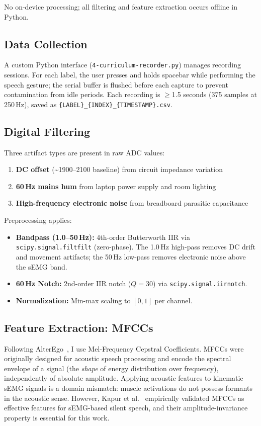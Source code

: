 \documentclass{article}
\begin{document}
No on-device processing; all filtering and feature extraction occurs offline in Python.

\subsection{Data Collection}

A custom Python interface (\texttt{4-curriculum-recorder.py}) manages recording sessions. For each label, the user presses and holds spacebar while performing the speech gesture; the serial buffer is flushed before each capture to prevent contamination from idle periods. Each recording is $\geq$1.5 seconds (375 samples at 250\,Hz), saved as \texttt{\{LABEL\}\_\{INDEX\}\_\{TIMESTAMP\}.csv}.

\subsection{Digital Filtering}

Three artifact types are present in raw ADC values:
\begin{enumerate}
    \item \textbf{DC offset} (\textasciitilde1900--2100 baseline) from circuit impedance variation
    \item \textbf{60\,Hz mains hum} from laptop power supply and room lighting
    \item \textbf{High-frequency electronic noise} from breadboard parasitic capacitance
\end{enumerate}

Preprocessing applies:
\begin{itemize}
    \item \textbf{Bandpass (1.0--50\,Hz):} 4th-order Butterworth IIR via \texttt{scipy.signal.filtfilt} (zero-phase). The 1.0\,Hz high-pass removes DC drift and movement artifacts; the 50\,Hz low-pass removes electronic noise above the sEMG band.
    \item \textbf{60\,Hz Notch:} 2nd-order IIR notch ($Q = 30$) via \texttt{scipy.signal.iirnotch}.
    \item \textbf{Normalization:} Min-max scaling to $[0, 1]$ per channel.
\end{itemize}

\subsection{Feature Extraction: MFCCs}

Following AlterEgo~\cite{kapur2018}, I use Mel-Frequency Cepstral Coefficients. MFCCs were originally designed for acoustic speech processing and encode the spectral envelope of a signal (the \emph{shape} of energy distribution over frequency), independently of absolute amplitude. Applying acoustic features to kinematic sEMG signals is a domain mismatch: muscle activations do not possess formants in the acoustic sense. However, Kapur et al.~\cite{kapur2018} empirically validated MFCCs as effective features for sEMG-based silent speech, and their amplitude-invariance property is essential for this work.
\end{document}
